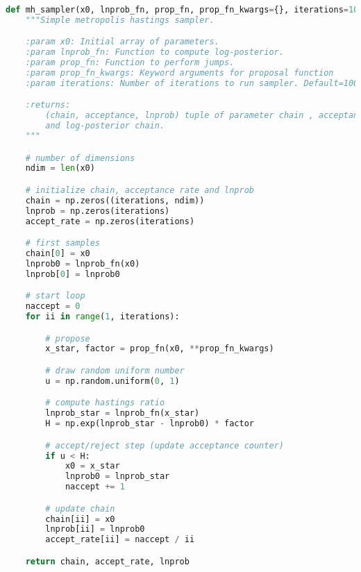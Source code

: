 \begin{lstlisting}[language=Python]
def mh_sampler(x0, lnprob_fn, prop_fn, prop_fn_kwargs={}, iterations=100000):
    """Simple metropolis hastings sampler.

    :param x0: Initial array of parameters.
    :param lnprob_fn: Function to compute log-posterior.
    :param prop_fn: Function to perform jumps.
    :param prop_fn_kwargs: Keyword arguments for proposal function
    :param iterations: Number of iterations to run sampler. Default=100000

    :returns:
        (chain, acceptance, lnprob) tuple of parameter chain , acceptance rate
        and log-posterior chain.
    """

    # number of dimensions
    ndim = len(x0)

    # initialize chain, acceptance rate and lnprob
    chain = np.zeros((iterations, ndim))
    lnprob = np.zeros(iterations)
    accept_rate = np.zeros(iterations)

    # first samples
    chain[0] = x0
    lnprob0 = lnprob_fn(x0)
    lnprob[0] = lnprob0

    # start loop
    naccept = 0
    for ii in range(1, iterations):

        # propose
        x_star, factor = prop_fn(x0, **prop_fn_kwargs)

        # draw random uniform number
        u = np.random.uniform(0, 1)

        # compute hastings ratio
        lnprob_star = lnprob_fn(x_star)
        H = np.exp(lnprob_star - lnprob0) * factor

        # accept/reject step (update acceptance counter)
        if u < H:
            x0 = x_star
            lnprob0 = lnprob_star
            naccept += 1

        # update chain
        chain[ii] = x0
        lnprob[ii] = lnprob0
        accept_rate[ii] = naccept / ii

    return chain, accept_rate, lnprob

\end{lstlisting}


		




